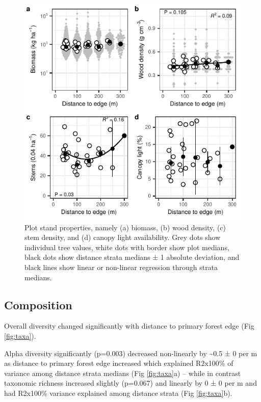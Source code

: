 \documentclass[
  12pt,
]{article}
\begin{document}
\begin{figure}
\centering
\includegraphics{merge_files/figure-latex/biomass-1.pdf}
\caption{\label{fig:biomass} Plot stand properties, namely (a) biomass, (b) wood density, (c) stem density, and (d) canopy light availability. Grey dots show individual tree values, white dots with border show plot medians, black dots show distance strata medians ± 1 absolute deviation, and black lines show linear or non-linear regression through strata medians.}
\end{figure}

\hypertarget{composition}{%
\subsection{Composition}\label{composition}}

Overall diversity changed significantly with distance to primary forest edge
(Fig \ref{fig:taxa}).

Alpha diversity significantly
(p=0.003)
decreased non-linearly by
\textasciitilde0.5 ±
0 per m
as distance to primary forest edge increased
which explained
R2x100\% of variance
among distance strata medians
(Fig \ref{fig:taxa}a) --
while in contrast taxonomic richness increased slightly
(p=0.067)
and linearly
by
0 ±
0 per m
and had R2x100\% variance explained
among distance strata
(Fig \ref{fig:taxa}b).
\end{document}
